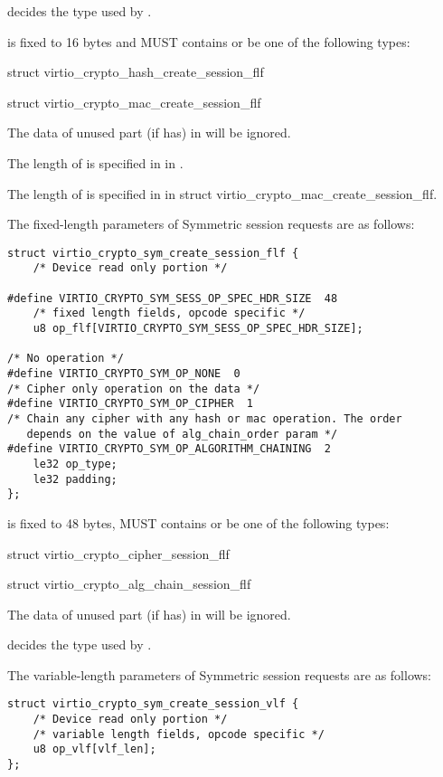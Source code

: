  decides the type used by .

 is fixed to 16 bytes and MUST contains or be one of
the following types:
\begin{itemize*}
\item struct virtio_crypto_hash_create_session_flf
\item struct virtio_crypto_mac_create_session_flf
\end{itemize*}
The data of unused part (if has) in  will be ignored.

The length of  is specified in  in .

The length of  is specified in  in struct
virtio_crypto_mac_create_session_flf.

The fixed-length parameters of Symmetric session requests are as follows:

\begin{lstlisting}
struct virtio_crypto_sym_create_session_flf {
    /* Device read only portion */

#define VIRTIO_CRYPTO_SYM_SESS_OP_SPEC_HDR_SIZE  48
    /* fixed length fields, opcode specific */
    u8 op_flf[VIRTIO_CRYPTO_SYM_SESS_OP_SPEC_HDR_SIZE];

/* No operation */
#define VIRTIO_CRYPTO_SYM_OP_NONE  0
/* Cipher only operation on the data */
#define VIRTIO_CRYPTO_SYM_OP_CIPHER  1
/* Chain any cipher with any hash or mac operation. The order
   depends on the value of alg_chain_order param */
#define VIRTIO_CRYPTO_SYM_OP_ALGORITHM_CHAINING  2
    le32 op_type;
    le32 padding;
};
\end{lstlisting}

 is fixed to 48 bytes, MUST contains or be one of
the following types:
\begin{itemize*}
\item struct virtio_crypto_cipher_session_flf
\item struct virtio_crypto_alg_chain_session_flf
\end{itemize*}
The data of unused part (if has) in  will be ignored.

 decides the type used by .

The variable-length parameters of Symmetric session requests are as follows:

\begin{lstlisting}
struct virtio_crypto_sym_create_session_vlf {
    /* Device read only portion */
    /* variable length fields, opcode specific */
    u8 op_vlf[vlf_len];
};
\end{lstlisting}

